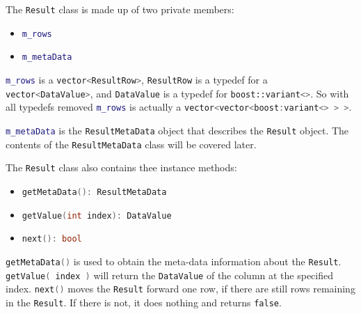 \documentclass[letterpaper, 12pt]{article}
\newcommand{\inlinecode}[1]{\colorbox{codegrey}{\lstinline[language=C++]{#1}}}
\begin{document}
  The \lstinline[basicstyle=\ttfamily]|Result| class is made up of two private members:
  \begin{itemize}
    \item \inlinecode{m_rows}
    \item \inlinecode{m_metaData}
  \end{itemize}
  \inlinecode{m_rows} is a
  \inlinecode{vector<ResultRow>},
  \inlinecode{ResultRow} is a typedef for
  a \inlinecode{vector<DataValue>}, and
  \inlinecode{DataValue} is a typedef for
  \inlinecode{boost::variant<>}.
  So with all typedefs removed \inlinecode{m_rows} is
  actually a
  \inlinecode{vector<vector<boost:variant<> > >}.

  \inlinecode{m_metaData} is the
  \inlinecode{ResultMetaData} object that describes the
  \inlinecode{Result} object. The contents of the
  \inlinecode{ResultMetaData} class will be covered later.
  \par\vspace{\baselineskip}
  The \lstinline[basicstyle=\ttfamily]|Result| class also contains thee instance methods:
  \begin{itemize}
    \item \inlinecode{getMetaData(): ResultMetaData}
    \item \inlinecode{getValue(int index): DataValue}
    \item \inlinecode{next(): bool}
  \end{itemize}
  \inlinecode{getMetaData()} is used to obtain the meta-data
  information about the \lstinline[basicstyle=\ttfamily]|Result|.
  \inlinecode{getValue( index )} will return the
  \inlinecode{DataValue} of the column at the specified index.
  \inlinecode{next()} moves the
  \inlinecode{Result} forward one row, if there are still rows
  remaining in the \lstinline[basicstyle=\ttfamily]|Result|. If there is not, it does
  nothing and returns \lstinline[basicstyle=\ttfamily]|false|.
\end{document}
